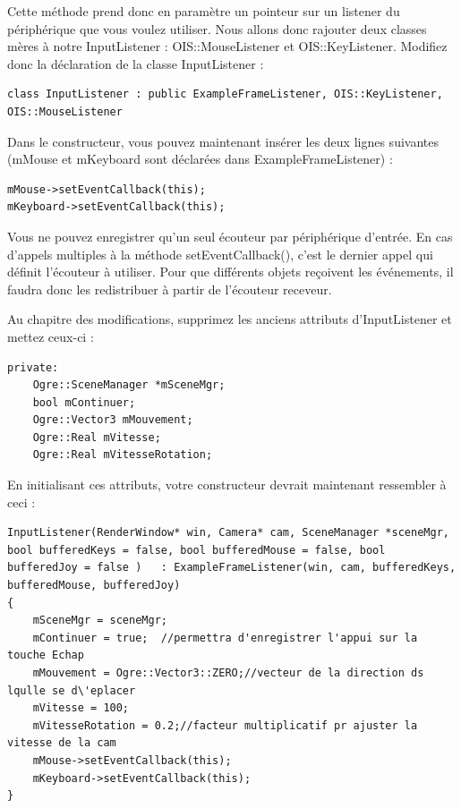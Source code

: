 \documentclass[10pt,a4paper]{report}
\begin{document}
Cette m\'ethode prend donc en param\`etre un pointeur sur un listener du p\'eriph\'erique que vous voulez utiliser. Nous allons donc rajouter deux classes m\`eres \`a notre InputListener : OIS::MouseListener et OIS::KeyListener. Modifiez donc la d\'eclaration de la classe InputListener :

\begin{lstlisting}[caption={Classes m\`eres pour gestion des Listeners}]
class InputListener : public ExampleFrameListener, OIS::KeyListener, OIS::MouseListener
\end{lstlisting}

Dans le constructeur, vous pouvez maintenant ins\'erer les deux lignes suivantes (mMouse et mKeyboard sont d\'eclar\'ees dans ExampleFrameListener) :

\begin{lstlisting}[caption={Enregistrement des listener}]
mMouse->setEventCallback(this);
mKeyboard->setEventCallback(this);
\end{lstlisting}

Vous ne pouvez enregistrer qu'un seul \'ecouteur par p\'eriph\'erique d'entr\'ee. En cas d'appels multiples \`a la m\'ethode setEventCallback(), c'est le dernier appel qui d\'efinit l'\'ecouteur \`a utiliser. Pour que diff\'erents objets re\c{c}oivent les \'ev\'enements, il faudra donc les redistribuer \`a partir de l'\'ecouteur receveur.

Au chapitre des modifications, supprimez les anciens attributs d'InputListener et mettez ceux-ci :

\begin{lstlisting}[caption={Attributs d'InputListener}]
private:
    Ogre::SceneManager *mSceneMgr;
    bool mContinuer;
    Ogre::Vector3 mMouvement;
    Ogre::Real mVitesse;
    Ogre::Real mVitesseRotation;
\end{lstlisting}

En initialisant ces attributs, votre constructeur devrait maintenant ressembler \`a ceci :

\begin{lstlisting}[caption={Constructeur d'InputListener}]
InputListener(RenderWindow* win, Camera* cam, SceneManager *sceneMgr, bool bufferedKeys = false, bool bufferedMouse = false, bool bufferedJoy = false )   : ExampleFrameListener(win, cam, bufferedKeys, bufferedMouse, bufferedJoy)
{
    mSceneMgr = sceneMgr;
    mContinuer = true;  //permettra d'enregistrer l'appui sur la touche Echap
    mMouvement = Ogre::Vector3::ZERO;//vecteur de la direction ds lqulle se d\'eplacer
    mVitesse = 100;
    mVitesseRotation = 0.2;//facteur multiplicatif pr ajuster la vitesse de la cam 
    mMouse->setEventCallback(this);
    mKeyboard->setEventCallback(this);
}
\end{lstlisting}
\end{document}
